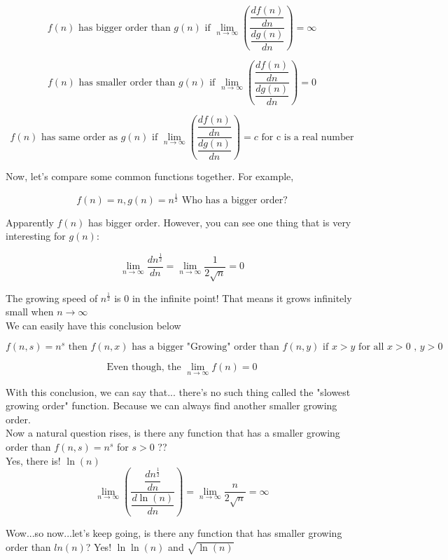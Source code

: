 \documentclass{article}
\begin{document}
  \[
	  f(n) \text{ has bigger order than } g(n) \text{ if } \displaystyle \lim_{n \to \infty} \left( \dfrac{\dfrac{df(n)}{dn}}{\dfrac{dg(n)}{dn}} \right) = \infty
  \]


  \[
	  f(n) \text{ has smaller order than } g(n) \text{ if } \displaystyle \lim_{n \to \infty} \left( \dfrac{\dfrac{df(n)}{dn}}{\dfrac{dg(n)}{dn}} \right) = 0
  \]

  \[
	  f(n) \text{ has same order as } g(n) \text{ if } \displaystyle \lim_{n \to \infty} \left( \dfrac{\dfrac{df(n)}{dn}}{\dfrac{dg(n)}{dn}} \right) = c \text{ for c is a real number}
  \]

  Now, let's compare some common functions together. For example, 

  \[
	  f(n) = n, g(n) = n^{\frac{1}{2}} \text{ Who has a bigger order?} 
  \]

  Apparently $f(n)$ has bigger order. However, you can see one thing that is very interesting for $g(n)$:

  \[
	  \lim_{n \to \infty} \dfrac{dn^{\frac{1}{2}}}{dn} = \lim_{n \to \infty} \dfrac{1}{2\sqrt{n}} = 0
  \]

  The growing speed of $n^{\frac{1}{2}}$ is $0$ in the infinite point! That means it grows infinitely small when $n \to \infty$ \\

  We can easily have this conclusion below 

  \[
	  f(n, s) = n^{s} \text{ then } f(n, x) \text{ has a bigger "Growing" order than } f(n, y) \text{ if } x>y \text{ for all } x>0 \text{ , } y>0 
  \]

  \[
	  \text{Even though, the }  \displaystyle \lim_{n \to \infty} f(n) = 0
  \]

  With this conclusion, we can say that... there's no such thing called the "slowest growing order" function. Because we can always find another smaller growing order. \\

  Now a natural question rises, is there any function that has a smaller growing order than $f(n, s) = n^{s}$ for $s>0$ ?? \\

  Yes, there is! $\ln(n)$ \\

  \[
	  \displaystyle \lim_{n \to \infty} \left( \dfrac{\dfrac{dn^{\frac{1}{2}}}{dn}}{\dfrac{d\ln(n)}{dn}} \right) = \lim_{n \to \infty} \dfrac{n}{2\sqrt{n}} = \infty
  \]

  Wow...so now...let's keep going, is there any function that has smaller growing order than $ln(n)$? Yes! $\ln\ln(n)$ and $\sqrt{\ln(n)}$ \\ 
\end{document}
